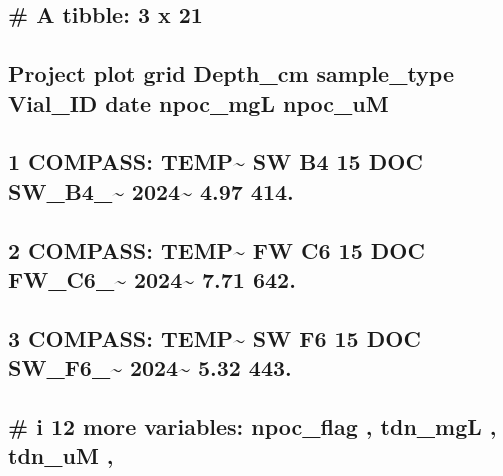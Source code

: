 \documentclass[
]{article}
\begin{document}
\begin{verbatim}
\end{verbatim}

\hypertarget{a-tibble-3-x-21}{%
\subsection{\# A tibble: 3 x 21}\label{a-tibble-3-x-21}}

\hypertarget{project-plot-grid-depth_cm-sample_type-vial_id-date-npoc_mgl-npoc_um}{%
\subsection{Project plot grid Depth\_cm sample\_type Vial\_ID date
npoc\_mgL
npoc\_uM}\label{project-plot-grid-depth_cm-sample_type-vial_id-date-npoc_mgl-npoc_um}}

\hypertarget{section-1}{%
\subsection{\texorpdfstring{ }{        }}\label{section-1}}

\hypertarget{compass-temp-sw-b4-15-doc-sw_b4_-2024-4.97-414.}{%
\subsection{1 COMPASS: TEMP\textasciitilde{} SW B4 15 DOC
SW\_B4\_\textasciitilde{} 2024\textasciitilde{} 4.97
414.}\label{compass-temp-sw-b4-15-doc-sw_b4_-2024-4.97-414.}}

\hypertarget{compass-temp-fw-c6-15-doc-fw_c6_-2024-7.71-642.}{%
\subsection{2 COMPASS: TEMP\textasciitilde{} FW C6 15 DOC
FW\_C6\_\textasciitilde{} 2024\textasciitilde{} 7.71
642.}\label{compass-temp-fw-c6-15-doc-fw_c6_-2024-7.71-642.}}

\hypertarget{compass-temp-sw-f6-15-doc-sw_f6_-2024-5.32-443.}{%
\subsection{3 COMPASS: TEMP\textasciitilde{} SW F6 15 DOC
SW\_F6\_\textasciitilde{} 2024\textasciitilde{} 5.32
443.}\label{compass-temp-sw-f6-15-doc-sw_f6_-2024-5.32-443.}}

\hypertarget{i-12-more-variables-npoc_flag-tdn_mgl-tdn_um}{%
\subsection{\# i 12 more variables: npoc\_flag , tdn\_mgL , tdn\_uM
,}\label{i-12-more-variables-npoc_flag-tdn_mgl-tdn_um}}
\end{document}
